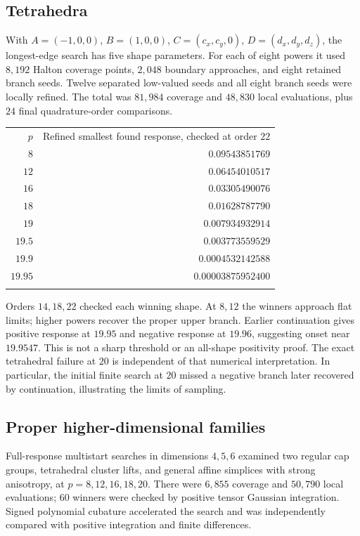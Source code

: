 \documentclass[11pt]{article}
\theoremstyle{definition}
\newcommand{\toprule}{\noalign{\hrule height 0.8pt\vskip4pt}}
\newcommand{\midrule}{\noalign{\vskip3pt\hrule height 0.4pt\vskip3pt}}
\newcommand{\bottomrule}{\noalign{\vskip3pt\hrule height 0.8pt}}
\begin{document}
\subsection{Tetrahedra}
With $A=(-1,0,0)$, $B=(1,0,0)$,
$C=(c_x,c_y,0)$, $D=(d_x,d_y,d_z)$, the longest-edge search has five
shape parameters. For each of eight powers it used $8{,}192$ Halton
coverage points, $2{,}048$ boundary approaches, and eight retained branch
seeds. Twelve separated low-valued seeds and all eight branch seeds were
locally refined. The total was $81{,}984$ coverage and $48{,}830$ local
evaluations, plus $24$ final quadrature-order comparisons.
\begin{center}
\begin{tabular}{@{}rr@{}}
\toprule
$p$ & Refined smallest found response, checked at order $22$\\
\midrule
$8$ & $0.09543851769$\\
$12$ & $0.06454010517$\\
$16$ & $0.03305490076$\\
$18$ & $0.01628787790$\\
$19$ & $0.007934932914$\\
$19.5$ & $0.003773559529$\\
$19.9$ & $0.0004532142588$\\
$19.95$ & $0.00003875952400$\\
\bottomrule
\end{tabular}
\end{center}
Orders $14,18,22$ checked each winning shape. At $8,12$ the winners
approach flat limits; higher powers recover the proper upper branch.
Earlier continuation gives positive response at $19.95$ and negative
response at $19.96$, suggesting onset near $19.9547$. This is not a
sharp threshold or an all-shape positivity proof. The exact tetrahedral
failure at $20$ is independent of that numerical interpretation.
In particular, the initial finite search at $20$ missed a negative branch
later recovered by continuation, illustrating the limits of sampling.

\subsection{Proper higher-dimensional families}
Full-response multistart searches in dimensions $4,5,6$ examined two
regular cap groups, tetrahedral cluster lifts, and general affine
simplices with strong anisotropy, at $p=8,12,16,18,20$.
There were $6{,}855$ coverage and $50{,}790$ local evaluations; $60$
winners were checked by positive tensor Gaussian integration.
Signed polynomial cubature accelerated the search and was independently
compared with positive integration and finite differences.
\end{document}
